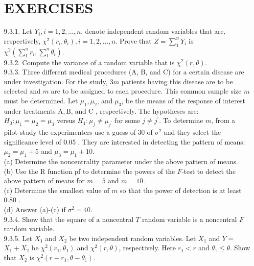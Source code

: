 \section*{EXERCISES}
9.3.1. Let $Y_{i}, i=1,2, \ldots, n$, denote independent random variables that are, respectively, $\chi^{2}\left(r_{i}, \theta_{i}\right), i=1,2, \ldots, n$. Prove that $Z=\sum_{1}^{n} Y_{i}$ is $\chi^{2}\left(\sum_{1}^{n} r_{i}, \sum_{1}^{n} \theta_{i}\right)$.\\
9.3.2. Compute the variance of a random variable that is $\chi^{2}(r, \theta)$.\\
9.3.3. Three different medical procedures (A, B, and C) for a certain disease are under investigation. For the study, $3 m$ patients having this disease are to be selected and $m$ are to be assigned to each procedure. This common sample size $m$ must be determined. Let $\mu_{1}, \mu_{2}$, and $\mu_{3}$, be the means of the response of interest under treatments $\mathrm{A}, \mathrm{B}$, and C , respectively. The hypotheses are: $H_{0}: \mu_{1}=\mu_{2}=\mu_{3}$ versus $H_{1}: \mu_{j} \neq \mu_{j^{\prime}}$ for some $j \neq j^{\prime}$. To determine $m$, from a pilot study the experimenters use a guess of 30 of $\sigma^{2}$ and they select the significance level of 0.05 . They are interested in detecting the pattern of means: $\mu_{2}=\mu_{1}+5$ and $\mu_{3}=\mu_{1}+10$.\\
(a) Determine the noncentrality parameter under the above pattern of means.\\
(b) Use the R function pf to determine the powers of the $F$-test to detect the above pattern of means for $m=5$ and $m=10$.\\
(c) Determine the smallest value of $m$ so that the power of detection is at least 0.80 .\\
(d) Answer (a)-(c) if $\sigma^{2}=40$.\\
9.3.4. Show that the square of a noncentral $T$ random variable is a noncentral $F$ random variable.\\
9.3.5. Let $X_{1}$ and $X_{2}$ be two independent random variables. Let $X_{1}$ and $Y=$ $X_{1}+X_{2}$ be $\chi^{2}\left(r_{1}, \theta_{1}\right)$ and $\chi^{2}(r, \theta)$, respectively. Here $r_{1}<r$ and $\theta_{1} \leq \theta$. Show that $X_{2}$ is $\chi^{2}\left(r-r_{1}, \theta-\theta_{1}\right)$.

